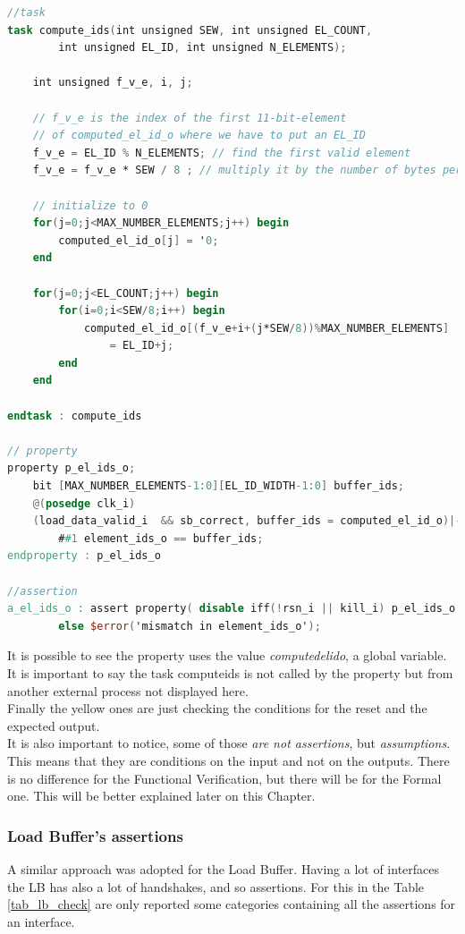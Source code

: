 \newpage
\linespread{1}
\begin{lstlisting}[language=Verilog,style=verilog-style, backgroundcolor=\color{lyel_palette}, frame=tlb]
//task
task compute_ids(int unsigned SEW, int unsigned EL_COUNT, 
	    int unsigned EL_ID, int unsigned N_ELEMENTS);

    int unsigned f_v_e, i, j;
		
    // f_v_e is the index of the first 11-bit-element 
    // of computed_el_id_o where we have to put an EL_ID
	f_v_e = EL_ID % N_ELEMENTS; // find the first valid element 
	f_v_e = f_v_e * SEW / 8 ; // multiply it by the number of bytes per el
		
	// initialize to 0
	for(j=0;j<MAX_NUMBER_ELEMENTS;j++) begin
	    computed_el_id_o[j] = '0;
	end

	for(j=0;j<EL_COUNT;j++) begin
		for(i=0;i<SEW/8;i++) begin
			computed_el_id_o[(f_v_e+i+(j*SEW/8))%MAX_NUMBER_ELEMENTS] 
			    = EL_ID+j;
		end
	end

endtask : compute_ids

// property
property p_el_ids_o;
	bit [MAX_NUMBER_ELEMENTS-1:0][EL_ID_WIDTH-1:0] buffer_ids;
	@(posedge clk_i)
	(load_data_valid_i  && sb_correct, buffer_ids = computed_el_id_o)|-> 
        ##1 element_ids_o == buffer_ids;
endproperty : p_el_ids_o

//assertion
a_el_ids_o : assert property( disable iff(!rsn_i || kill_i) p_el_ids_o ) 
        else $error('mismatch in element_ids_o');
\end{lstlisting}
\linespread{1.2}
\bigskip

It is possible to see the property uses the value \textit{computed\+el\+id\+o}, a global variable. It is important to say the task compute\+ids is not called by the property but from another external process not displayed here.\\

Finally the yellow ones are just checking the conditions for the reset and the expected output.\\

It is also important to notice, some of those \textit{are not assertions}, but \textit{assumptions}. This means that they are conditions on the input and not on the outputs. There is no difference for the Functional Verification, but there will be for the Formal one. This will be better explained later on this Chapter.\\



\subsubsection{Load Buffer's assertions}
A similar approach was adopted for the Load Buffer. Having a lot of interfaces the LB has also a lot of handshakes, and so assertions. For this in the Table \ref{tab_lb_check} are only reported some categories containing all the assertions for an interface.\\


